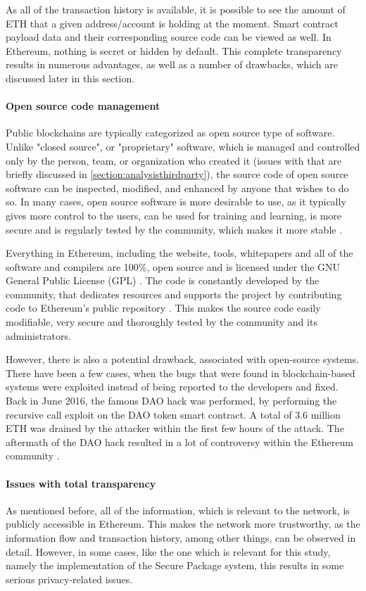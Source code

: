 As all of the transaction history is available, it is possible to see the amount of ETH that a given address/account is holding at the moment. Smart contract payload data and their corresponding source code can be viewed as well. In Ethereum, nothing is secret or hidden by default. This complete transparency results in numerous advantages, as well as a number of drawbacks, which are discussed later in this section.

\paragraph{Open source code management} 
Public blockchains are typically categorized as open source type of software. Unlike "closed source", or "proprietary" software, which is managed and controlled only by the person, team, or organization who created it (issues with that are briefly discussed in \ref{section:analysisthirdparty}), the source code of open source software can be inspected, modified, and enhanced by anyone that wishes to do so. In many cases, open source software is more desirable to use, as it typically gives more control to the users, can be used for training and learning, is more secure and is regularly tested by the community, which makes it more stable \citep{opensourceadvantages}.

Everything in Ethereum, including the website, tools, whitepapers and all of the software and compilers are 100\%, open source and is licensed under the GNU General Public License (GPL) \citep{gpl}. The code is constantly developed by the community, that dedicates resources and supports the project by contributing code to Ethereum's public repository \citep{ethereumrepo}. This makes the source code easily modifiable, very secure and thoroughly tested by the community and its administrators.

However, there is also a potential drawback, associated with open-source systems. There have been a few cases, when the bugs that were found in blockchain-based systems were exploited instead of being reported to the developers and fixed. Back in June 2016, the famous DAO hack was performed, by performing the recursive call exploit on the DAO token smart contract. A total of 3.6 million ETH was drained by the attacker within the first few hours of the attack. The aftermath of the DAO hack resulted in a lot of controversy within the Ethereum community \citep{dao}.

\paragraph{Issues with total transparency}
As mentioned before, all of the information, which is relevant to the network, is publicly accessible in Ethereum. This makes the network more trustworthy, as the information flow and transaction history, among other things, can be observed in detail. However, in some cases, like the one which is relevant for this study, namely the implementation of the Secure Package system, this results in some serious privacy-related issues. 

